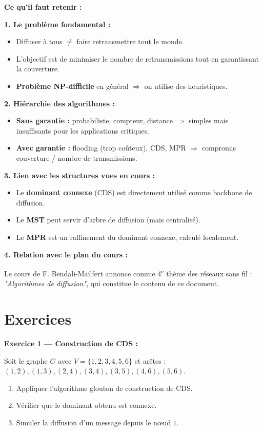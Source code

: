 \documentclass[12pt,a4paper]{article}
\begin{document}
\begin{important}
\textbf{Ce qu'il faut retenir :}

\textbf{1. Le problème fondamental :}
\begin{itemize}
    \item Diffuser à tous $\neq$ faire retransmettre tout le monde.
    \item L'objectif est de minimiser le nombre de retransmissions tout en garantissant la
          couverture.
    \item \textbf{Problème NP-difficile} en général $\Rightarrow$ on utilise des heuristiques.
\end{itemize}

\textbf{2. Hiérarchie des algorithmes :}
\begin{itemize}
    \item \textbf{Sans garantie :} probabiliste, compteur, distance $\Rightarrow$ simples mais
          insuffisants pour les applications critiques.
    \item \textbf{Avec garantie :} flooding (trop coûteux), CDS, MPR $\Rightarrow$ compromis
          couverture / nombre de transmissions.
\end{itemize}

\textbf{3. Lien avec les structures vues en cours :}
\begin{itemize}
    \item Le \textbf{dominant connexe} (CDS) est directement utilisé comme backbone de
          diffusion.
    \item Le \textbf{MST} peut servir d'arbre de diffusion (mais centralisé).
    \item Le \textbf{MPR} est un raffinement du dominant connexe, calculé localement.
\end{itemize}

\textbf{4. Relation avec le plan du cours :}

Le cours de F. Bendali-Mailfert annonce comme 4\textsuperscript{e} thème des réseaux sans fil :
\emph{"Algorithmes de diffusion"}, qui constitue le contenu de ce document.
\end{important}

\section*{Exercices}

\begin{exemple}
\textbf{Exercice 1 --- Construction de CDS :}

Soit le graphe $G$ avec $V = \{1,2,3,4,5,6\}$ et arêtes :
$(1,2),(1,3),(2,4),(3,4),(3,5),(4,6),(5,6)$.

\begin{enumerate}
    \item Appliquer l'algorithme glouton de construction de CDS.
    \item Vérifier que le dominant obtenu est connexe.
    \item Simuler la diffusion d'un message depuis le nœud $1$.
\end{enumerate}
\end{exemple}
\end{document}
